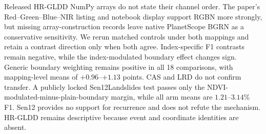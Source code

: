 Released HR-GLDD NumPy arrays do not state their channel order. The paper's
Red--Green--Blue--NIR listing and notebook display support RGBN more strongly,
but missing array-construction records leave native PlanetScope BGRN as a
conservative sensitivity. We rerun matched controls under both mappings and
retain a contrast direction only when both agree. Index-specific F1 contrasts
remain negative, while the index-modulated boundary effect changes sign.
Generic boundary weighting remains positive in all 18 comparisons, with
mapping-level means of $+0.96$--$+1.13$ points. CAS and LRD do not confirm
transfer. A publicly locked Sen12Landslides test passes only the
NDVI-modulated-minus-plain-boundary margin, while all arm means are
$1.21$--$3.14\%$ F1. Sen12 provides no support for recurrence and does not
refute the mechanism. HR-GLDD remains descriptive because event and coordinate
identities are absent.
